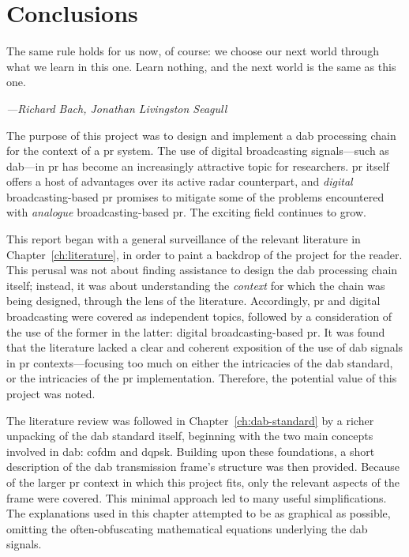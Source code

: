 \documentclass[class=report,11pt,crop=false]{standalone}
\begin{document}
\chapter{Conclusions \label{ch:conclusions}}
\epigraph{The same rule holds for us now, of course: we choose our next world through what we learn in this one. Learn nothing, and the next world is the same as this one.}%
    {\emph{---Richard Bach, Jonathan Livingston Seagull}}

The purpose of this project was to design and implement a \gls{dab} processing chain for the context of a \gls{pr} system. The use of digital broadcasting signals---such as \gls{dab}---in \gls{pr} has become an increasingly attractive topic for researchers. \gls{pr} itself offers a host of advantages over its active radar counterpart, and \emph{digital} broadcasting-based \gls{pr} promises to mitigate some of the problems encountered with \emph{analogue} broadcasting-based \gls{pr}. The exciting field continues to grow.

This report began with a general surveillance of the relevant literature in Chapter~\ref{ch:literature}, in order to paint a backdrop of the project for the reader. This perusal was not about finding assistance to design the \gls{dab} processing chain itself; instead, it was about understanding the \emph{context} for which the chain was being designed, through the lens of the literature. Accordingly, \gls{pr} and digital broadcasting were covered as independent topics, followed by a consideration of the use of the former in the latter: digital broadcasting-based \gls{pr}. It was found that the literature lacked a clear and coherent exposition of the use of \gls{dab} signals in \gls{pr} contexts---focusing too much on either the intricacies of the \gls{dab} standard, or the intricacies of the \gls{pr} implementation. Therefore, the potential value of this project was noted.

The literature review was followed in Chapter~\ref{ch:dab-standard} by a richer unpacking of the \gls{dab} standard itself, beginning with the two main concepts involved in \gls{dab}: \gls{cofdm} and \gls{dqpsk}. Building upon these foundations, a short description of the \gls{dab} transmission frame's structure was then provided. Because of the larger \gls{pr} context in which this project fits, only the relevant aspects of the frame were covered. This minimal approach led to many useful simplifications. The explanations used in this chapter attempted to be as graphical as possible, omitting the often-obfuscating mathematical equations underlying the \gls{dab} signals.
\end{document}

